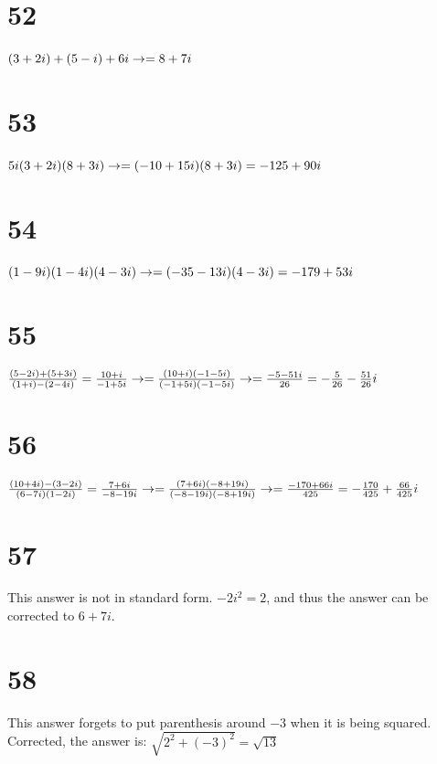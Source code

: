 \documentclass{article}
\theoremstyle{definition}
\begin{document}
\section*{52}
$(3+2i)+(5-i)+6i\newline\rightarrow =8+7i$

\section*{53}
$5i(3+2i)(8+3i)\newline\rightarrow =(-10+15i)(8+3i)=-125+90i$

\section*{54}
$(1-9i)(1-4i)(4-3i)\newline\rightarrow =(-35-13i)(4-3i)=-179+53i$

\section*{55}
$\frac{(5-2i)+(5+3i)}{(1+i)-(2-4i)}=\frac{10+i}{-1+5i}\newline\rightarrow =\frac{(10+i)(-1-5i)}{(-1+5i)(-1-5i)}\newline\rightarrow 
=\frac{-5-51i}{26}=-\frac{5}{26}-\frac{51}{26}i$

\section*{56}
$\frac{(10+4i)-(3-2i)}{(6-7i)(1-2i)}=\frac{7+6i}{-8-19i}\newline\rightarrow =\frac{(7+6i)(-8+19i)}{(-8-19i)(-8+19i)}\newline\rightarrow 
=\frac{-170+66i}{425}=-\frac{170}{425}+\frac{66}{425}i$

\section*{57}
This answer is not in standard form. $-2i^2=2$, and thus the answer can be corrected to $6+7i$.

\section*{58}
This answer forgets to put parenthesis around $-3$ when it is being squared. Corrected, the answer is:\newline
$\sqrt{2^2+(-3)^2}=\sqrt{13}$
\end{document}
